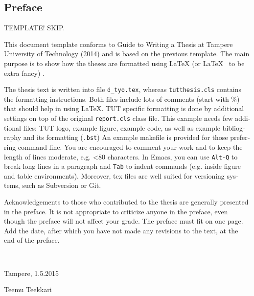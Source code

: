 \documentclass[12pt,a4paper,english]{tutthesis}
\begin{document}
\begin{otherlanguage}{english} %
\makeatother %

%
%
\chapter*{Preface}

TEMPLATE! SKIP.

This document template conforms to Guide to Writing a Thesis at
Tampere University of Technology (2014) and is based on the previous
template. The main purpose is to show how the theses are formatted
using LaTeX (or \LaTeX ~ to be extra fancy) .


The thesis text is written into file \texttt{d\_tyo.tex}, whereas
\texttt{tutthesis.cls} contains the formatting instructions. Both
files include lots of comments (start with \%) that should help in
using LaTeX. TUT specific formatting is done by additional settings on
top of the original \texttt{report.cls} class file. This example needs
few additional files: TUT logo, example figure, example code, as well
as example bibliography and its formatting (\texttt{.bst}) An example
makefile is provided for those preferring command line. You are
encouraged to comment your work and to keep the length of lines
moderate, e.g. <80 characters. In Emacs, you can use \texttt{Alt-Q} to
break long lines in a paragraph and \texttt{Tab} to indent commands
(e.g. inside figure and table environments). Moreover, tex files are
well suited for versioning systems, such as Subversion or Git.  

Acknowledgements to those who contributed to the thesis are generally
presented in the preface. It is not appropriate to criticize anyone in
the preface, even though the preface will not affect your grade. The
preface must fit on one page. Add the date, after which you have not
made any revisions to the text, at the end of the preface.

~ 

Tampere, 1.5.2015
~


Teemu Teekkari
%
%


\end{otherlanguage}
\end{document}
